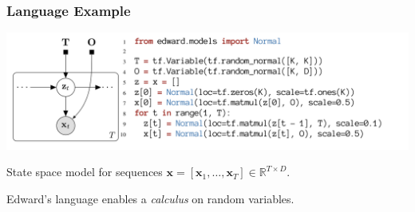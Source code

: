 \documentclass[10pt,
               xcolor={usenames,dvipsnames},
               hyperref={colorlinks,linktoc=all,citecolor=Plum,linkcolor=MidnightBlue,urlcolor=MidnightBlue},noamssymb]{beamer}
\begin{document}
\begin{frame}
\frametitle{Language Example}
\begin{center}
\includegraphics[width=1.05\textwidth]{img/ssm-program.png}
\end{center}

\vspace{1ex}
State space model for sequences
$\mathbf{x}=[\mathbf{x}_1,\ldots,\mathbf{x}_T]\in\mathbb{R}^{T\times D}$.
\vspace{2ex}

Edward's language enables a \emph{calculus} on random variables.
\end{frame}
\end{document}
